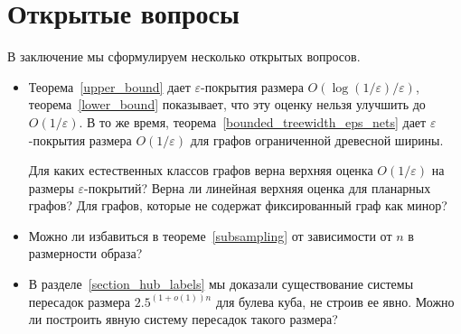 \documentclass[12pt]{article}
\newcommand{\eps}{\varepsilon}
\begin{document}
    \section{Открытые вопросы}
    В заключение мы сформулируем несколько открытых вопросов.
    \begin{itemize}
        \item
        Теорема~\ref{upper_bound} дает $\eps$-покрытия размера $O(\log(1 / \eps) / \eps)$, теорема~\ref{lower_bound}
        показывает, что эту оценку нельзя улучшить до $O(1 / \eps)$. В то же время,
        теорема~\ref{bounded_treewidth_eps_nets} дает
        $\eps$-покрытия размера $O(1 / \eps)$ для графов ограниченной древесной ширины.

        Для каких естественных классов графов верна верхняя оценка $O(1 / \eps)$ на размеры $\eps$-покрытий?
        Верна ли линейная верхняя оценка для планарных графов?
        Для графов, которые не содержат фиксированный граф как минор?
        \item
        Можно ли избавиться в теореме~\ref{subsampling} от зависимости от $n$ в размерности образа?
        \item
        В разделе~\ref{section_hub_labels} мы доказали существование системы пересадок размера $2.5^{(1+o(1))n}$ для
        булева куба, не строив ее явно.
        Можно ли построить явную систему пересадок такого размера?
    \end{itemize}
    
    
\end{document}
